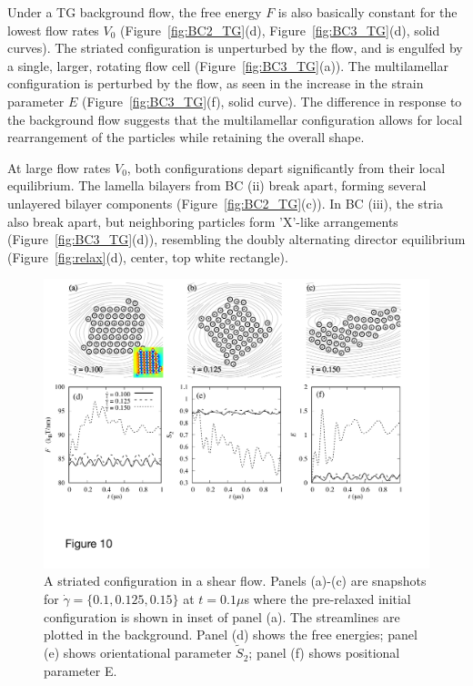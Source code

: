 \documentclass[prb,preprint,showpacs,preprintnumbers,amsmath,amssymb,longbibliography]{revtex4-1}
\begin{document}
Under a TG background flow, the free energy $F$ is also basically
constant for the lowest flow rates $V_0$ (Figure~\ref{fig:BC2_TG}(d),
Figure~\ref{fig:BC3_TG}(d), solid curves). The striated configuration is
unperturbed by the flow, and is engulfed by a single, larger, rotating
flow cell (Figure~\ref{fig:BC3_TG}(a)). The multilamellar configuration
is perturbed by the flow, as seen in the increase in the strain
parameter $E$ (Figure~\ref{fig:BC3_TG}(f), solid curve). The difference
in response to the background flow suggests that the multilamellar
configuration allows for local rearrangement of the particles while
retaining the overall shape.

At large flow rates $V_0$, both configurations depart significantly from
their local equilibrium. The lamella bilayers from BC (ii) break apart,
forming several unlayered bilayer components
(Figure~\ref{fig:BC2_TG}(c)). In BC (iii), the stria also break apart,
but neighboring particles form 'X'-like arrangements
(Figure~\ref{fig:BC3_TG}(d)), resembling the doubly alternating director
equilibrium (Figure~\ref{fig:relax}(d), center, top white rectangle).



\begin{figure}
  \begin{center}
\includegraphics[width=1.0\textwidth]{Figures/Figure10.pdf}        
  \end{center}
  \caption{\label{fig:BC3_shear} A striated configuration in a shear
  flow. Panels (a)-(c) are snapshots for $\dot \gamma = \{0.1, 0.125,
  0.15\}$ at $t=0.1\mu$s where the pre-relaxed initial configuration is
  shown in inset of panel (a). The streamlines are plotted in the
  background. Panel (d) shows the free energies; panel (e) shows
  orientational parameter $\tilde{S}_2$; panel (f) shows positional
  parameter E.}
\end{figure}
\end{document}
